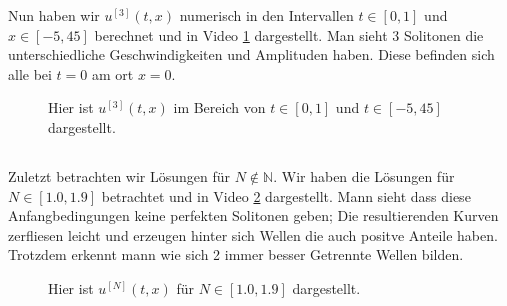 \documentclass[ngerman]{scrartcl}
\begin{document}
Nun haben wir $u^{[3]}(t, x)$ numerisch in den Intervallen $t \in[0,1]$ und $x\in[-5,45]$ berechnet und in Video \ref{vid:H10.3} dargestellt. 
Man sieht 3 Solitonen die unterschiedliche Geschwindigkeiten und Amplituden haben.
Diese befinden sich alle bei $t=0$ am ort $x=0$.

\begin{figure}[htbp]
	\centering
	\caption[]{Hier ist $u^{[3]}(t, x)$ im Bereich von $t\in[0,1]$ und $t\in[-5,45]$ dargestellt.}
	\label{vid:H10.3}
\end{figure}
\subsection{}
Zuletzt betrachten wir Lösungen für $N\notin\mathbb{N}$.
Wir haben die Lösungen für $N\in[1.0,1.9]$ betrachtet und in Video \ref{vid:H10.4} dargestellt.
Mann sieht dass diese Anfangbedingungen keine perfekten Solitonen geben;
Die resultierenden Kurven zerfliesen leicht und erzeugen hinter sich Wellen die auch positve Anteile haben.
Trotzdem erkennt mann wie sich 2 immer besser Getrennte Wellen bilden.

\begin{figure}[htbp]
	\centering
	\caption[]{Hier ist $u^{[N]}(t, x)$ für $N\in[1.0,1.9]$ dargestellt.}
	\label{vid:H10.4}
\end{figure}
\end{document}
